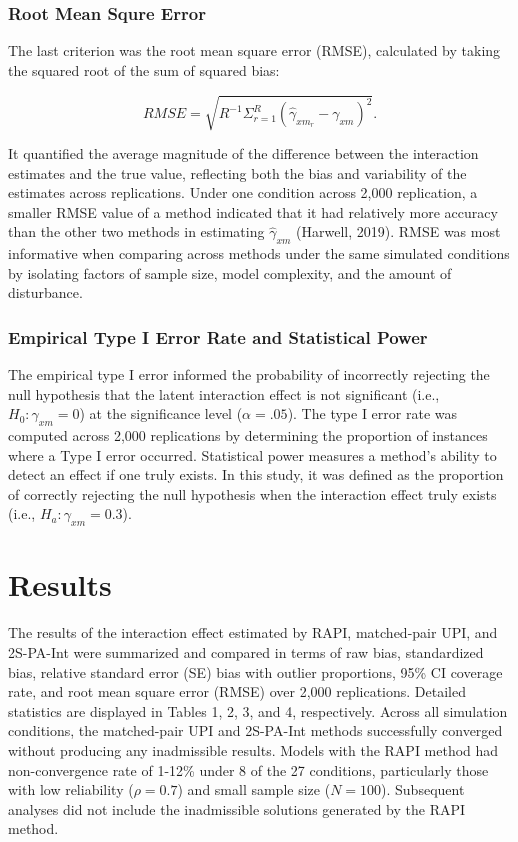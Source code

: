 \documentclass[
  man]{apa6}
\begin{document}
\subsubsection{Root Mean Squre Error}\label{root-mean-squre-error}

The last criterion was the root mean square error (RMSE), calculated by taking the squared root of the sum of squared bias:

\begin{equation}
RMSE = \sqrt{R^{-1}\Sigma^{R}_{r = 1}(\hat{\gamma}_{xm_{r}} - \gamma_{xm})^2}.
\end{equation}

It quantified the average magnitude of the difference between the interaction estimates and the true value, reflecting both the bias and variability of the estimates across replications. Under one condition across 2,000 replication, a smaller RMSE value of a method indicated that it had relatively more accuracy than the other two methods in estimating \(\hat{\gamma}_{xm}\) (Harwell, 2019). RMSE was most informative when comparing across methods under the same simulated conditions by isolating factors of sample size, model complexity, and the amount of disturbance.

\subsubsection{Empirical Type I Error Rate and Statistical Power}\label{empirical-type-i-error-rate-and-statistical-power}

The empirical type I error informed the probability of incorrectly rejecting the null hypothesis that the latent interaction effect is not significant (i.e., \(H_{0}: \gamma_{xm} = 0\)) at the significance level (\(\alpha = .05\)). The type I error rate was computed across 2,000 replications by determining the proportion of instances where a Type I error occurred. Statistical power measures a method's ability to detect an effect if one truly exists. In this study, it was defined as the proportion of correctly rejecting the null hypothesis when the interaction effect truly exists (i.e., \(H_{a}: \gamma_{xm} = 0.3\)).

\section{Results}\label{results}

The results of the interaction effect estimated by RAPI, matched-pair UPI, and 2S-PA-Int were summarized and compared in terms of raw bias, standardized bias, relative standard error (SE) bias with outlier proportions, 95\% CI coverage rate, and root mean square error (RMSE) over 2,000 replications. Detailed statistics are displayed in Tables 1, 2, 3, and 4, respectively. Across all simulation conditions, the matched-pair UPI and 2S-PA-Int methods successfully converged without producing any inadmissible results. Models with the RAPI method had non-convergence rate of 1-12\% under 8 of the 27 conditions, particularly those with low reliability (\(\rho = 0.7\)) and small sample size (\(\textit{N} = 100\)). Subsequent analyses did not include the inadmissible solutions generated by the RAPI method.
\end{document}
